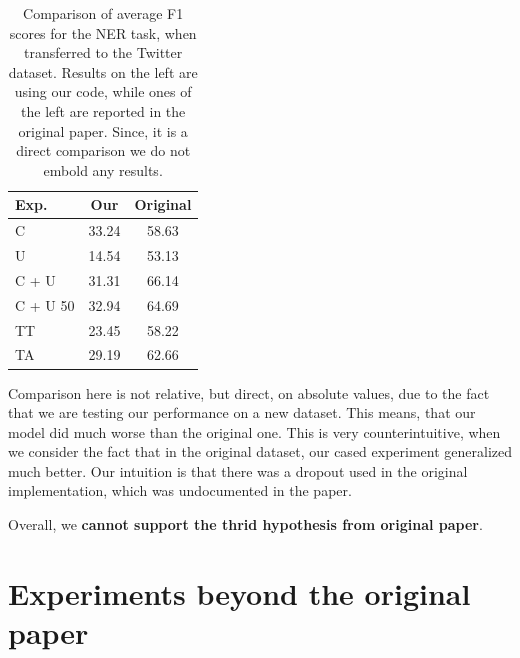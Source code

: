 \documentclass[11pt,a4paper]{article}
\begin{document}
    \begin{table}[h]
        \centering
        \begin{tabular}{|l|c|c|}
            \hline
            Exp. & Our & Original \\
            \hline
            C        & 33.24 & 58.63 \\
            U        & 14.54 & 53.13 \\
            C + U    & 31.31 & 66.14 \\
            C + U 50 & 32.94 & 64.69 \\
            TT       & 23.45 & 58.22 \\
            TA       & 29.19 & 62.66 \\
            \hline
        \end{tabular}
        \caption{Comparison of average F1 scores for the NER task, when transferred to the Twitter dataset. Results on the left are using our code, while ones of the left are reported in the original paper. Since, it is a direct comparison we do not embold any results.}
        \label{tab:ner-twitter-comp}
    \end{table}

    Comparison here is not relative, but direct, on absolute values, due to the fact that we are testing our performance on a new dataset. This means, that our model did much worse than the original one. This is very counterintuitive, when we consider the fact that in the original dataset, our cased experiment generalized much better. Our intuition is that there was a dropout used in the original implementation, which was undocumented in the paper.

    Overall, we \textbf{cannot support the thrid hypothesis from original paper}.

\section{Experiments beyond the original paper}
\end{document}
